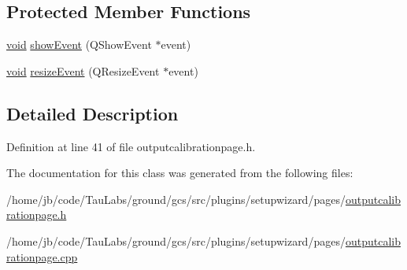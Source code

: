 \subsection*{\-Protected \-Member \-Functions}
\begin{DoxyCompactItemize}
\item 
\hyperlink{group___u_a_v_objects_plugin_ga444cf2ff3f0ecbe028adce838d373f5c}{void} \hyperlink{group___output_calibration_page_gaccfd0563f0faafb93bacafa8cf873035}{show\-Event} (\-Q\-Show\-Event $\ast$event)
\item 
\hyperlink{group___u_a_v_objects_plugin_ga444cf2ff3f0ecbe028adce838d373f5c}{void} \hyperlink{group___output_calibration_page_gafa4831a5e77c0a3a03ad4e5869d4d601}{resize\-Event} (\-Q\-Resize\-Event $\ast$event)
\end{DoxyCompactItemize}


\subsection{\-Detailed \-Description}


\-Definition at line 41 of file outputcalibrationpage.\-h.



\-The documentation for this class was generated from the following files\-:\begin{DoxyCompactItemize}
\item 
/home/jb/code/\-Tau\-Labs/ground/gcs/src/plugins/setupwizard/pages/\hyperlink{outputcalibrationpage_8h}{outputcalibrationpage.\-h}\item 
/home/jb/code/\-Tau\-Labs/ground/gcs/src/plugins/setupwizard/pages/\hyperlink{outputcalibrationpage_8cpp}{outputcalibrationpage.\-cpp}\end{DoxyCompactItemize}
